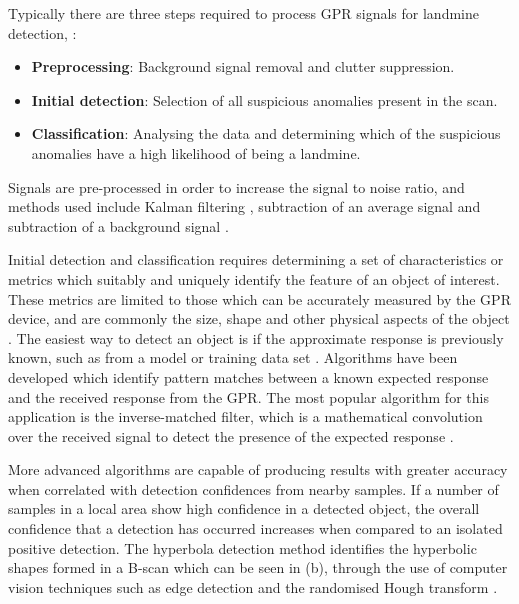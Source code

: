 \documentclass[main.tex]{subfiles}
\begin{document}
Typically there are three steps required to process GPR signals for landmine detection, \parencite{Ho.etal2004}:
\begin{itemize}
\item \textbf{Preprocessing}: Background signal removal and clutter suppression.
\item \textbf{Initial detection}: Selection of all suspicious anomalies present in the scan.
\item \textbf{Classification}: Analysing the data and determining which of the suspicious anomalies have a high likelihood of being a landmine.
\end{itemize}
Signals are pre-processed in order to increase the signal to noise ratio, and methods used include Kalman filtering \parencite{torrione2006ground}, subtraction of an average signal \parencite{gader2000fuzzy} and subtraction of a background signal \parencite{ko2012gpr}. 

Initial detection and classification  requires determining a set of characteristics or metrics which suitably and uniquely identify the feature of an object of interest. These metrics are limited to those which can be accurately measured by the GPR device, and are commonly the size, shape and other physical aspects of the object \parencite{Ho2008}. The easiest way to detect an object is if the approximate response is previously known, such as from a model or training data set \parencite{Yarovoy2009}. Algorithms have been developed which identify pattern matches between a known expected response and the received response from the GPR. The most popular algorithm for this application is the inverse-matched filter, which is a mathematical convolution over the received signal to detect the presence of the expected response \parencite{Osumi1984}. 

More advanced algorithms are capable of producing results with greater accuracy when correlated with detection confidences from nearby samples. If a number of samples in a local area show high confidence in a detected object, the overall confidence that a detection has occurred increases when compared to an isolated positive detection. The hyperbola detection method identifies the hyperbolic shapes formed in a B-scan which can be seen in  (b), through the use of computer vision techniques such as edge detection and the randomised Hough transform \parencite{Xu1990}.

\end{document}
